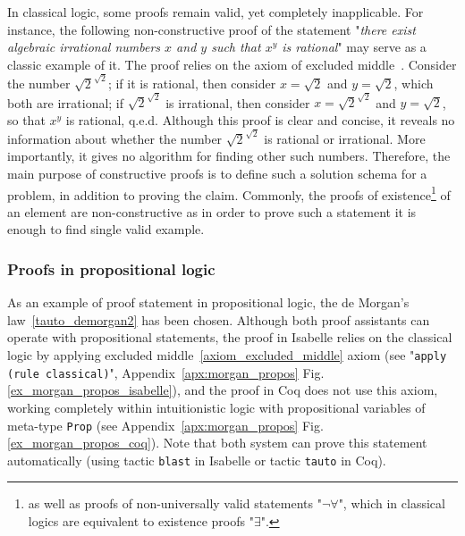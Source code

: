 \documentclass[article]{aaltoseries}
\begin{document}
In classical logic, some proofs remain valid, yet completely inapplicable. For instance, the following non-constructive proof of the statement "\textit{there exist algebraic irrational numbers $x$ and $y$ such that $x^y$ is rational}" may serve as a classic example of it.
The proof relies on the axiom of excluded middle~\cite{Harrison09}. Consider the number $\sqrt{2}^{\sqrt{2}}$; if it is rational, then consider $x = \sqrt{2}$ and $y = \sqrt{2}$, which both are irrational; if $\sqrt{2}^{\sqrt{2}}$ is irrational, then consider $x = \sqrt{2}^{\sqrt{2}}$ and $y = \sqrt{2}$, so that $x^{y}$ is rational, q.e.d. Although this proof is clear and concise, it reveals no information about whether the number $\sqrt{2}^{\sqrt{2}}$ is rational or irrational. More importantly, it gives no algorithm for finding other such numbers. Therefore, the main purpose of constructive proofs is to define such a solution schema for a problem, in addition to proving the claim.
Commonly, the proofs of existence\footnote{as well as proofs of non-universally valid statements "$\neg \forall$", which in classical logics are equivalent to existence proofs "$\exists$".} of an element are non-constructive as in order to prove such a statement it is enough to find single valid example.




\subsubsection{Proofs in propositional logic}

As an example of proof statement in propositional logic, the de Morgan's law~\eqref{tauto_demorgan2} has been chosen. Although both proof assistants can operate with propositional statements, the proof in Isabelle relies on the classical logic by applying excluded middle~\eqref{axiom_excluded_middle} axiom (see "\texttt{apply (rule classical)}", Appendix~\ref{apx:morgan_propos} Fig.\ref{ex_morgan_propos_isabelle}), and the proof in Coq does not use this axiom, working completely within intuitionistic logic with propositional variables of meta-type \texttt{Prop} (see Appendix~\ref{apx:morgan_propos} Fig.\ref{ex_morgan_propos_coq}). Note that both system can prove this statement automatically (using tactic \texttt{blast} in Isabelle or tactic \texttt{tauto} in Coq).
 
\end{document}
